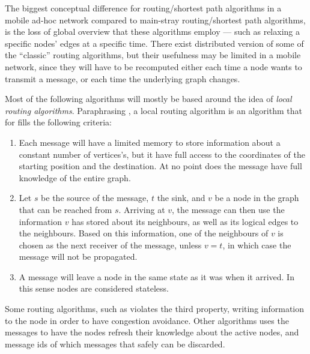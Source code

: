 \documentclass[letter, 12pt, english, draft]{article}
\begin{document}
The biggest conceptual difference for routing/shortest path algorithms in a mobile ad-hoc network compared to main-stray routing/shortest path algorithms, is the loss of global overview that these algorithms employ --- such as relaxing a specific nodes' edges at a specific time. There exist distributed version of some of the ``classic'' routing algorithms, but their usefulness may be limited in a mobile network, since they will have to be recomputed either each time a node wants to transmit a message, or each time the underlying graph changes.

Most of the following algorithms will mostly be based around the idea of \emph{local routing algorithms}. Paraphrasing \cite{compass}, a local routing algorithm is an algorithm that for fills the following criteria:
\begin{enumerate}
\item Each message will have a limited memory to store information about a constant number of vertices's, but it have full access to the coordinates of the starting position and the destination. At no point does the message have full knowledge of the entire graph.
\item Let $s$ be the source of the message, $t$ the sink, and $v$ be a node in the graph that can be reached from $s$. Arriving at $v$, the message can then use the information $v$ has stored about its neighbours, as well as its logical edges to the neighbours. Based on this information, one of the neighbours of $v$ is chosen as the next receiver of the message, unless $v = t$, in which case the message will not be propagated.
\item A message will leave a node in the same state as it was when it arrived. In this sense nodes are considered stateless.\end{enumerate}

Some routing algorithms, such as \cite{speed} violates the third property, writing information to the node in order to have congestion avoidance. Other algorithms uses the messages to have the nodes refresh their knowledge about the active nodes, and message ids of which messages that safely can be discarded. 
\end{document}
